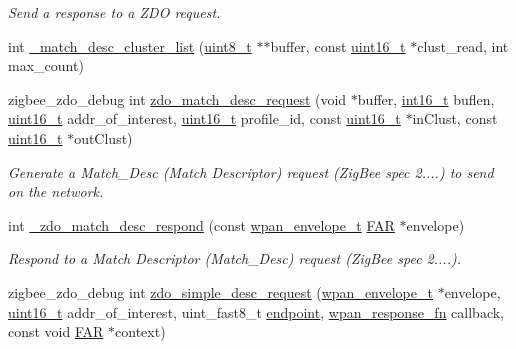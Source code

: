 \begin{DoxyCompactItemize}
\begin{DoxyCompactList}\small\item\em Send a response to a Z\+DO request. \end{DoxyCompactList}\item 
int \hyperlink{group__zdo_ga1a65d88af9f0c9906d548aa1ff2586f7}{\+\_\+match\+\_\+desc\+\_\+cluster\+\_\+list} (\hyperlink{group__hal__dos_gae1affc9ca37cfb624959c866a73f83c2}{uint8\+\_\+t} $\ast$$\ast$buffer, const \hyperlink{group__hal__dos_ga5a8b2dc9e45a9ee81a94ef304fb62505}{uint16\+\_\+t} $\ast$clust\+\_\+read, int max\+\_\+count)
\item 
zigbee\+\_\+zdo\+\_\+debug int \hyperlink{group__zdo_ga5746efffb4b90718eb973796f2b4bb41}{zdo\+\_\+match\+\_\+desc\+\_\+request} (void $\ast$buffer, \hyperlink{group__hal__dos_ga2140805d08462d474b82ddc8d1c2f3e6}{int16\+\_\+t} buflen, \hyperlink{group__hal__dos_ga5a8b2dc9e45a9ee81a94ef304fb62505}{uint16\+\_\+t} addr\+\_\+of\+\_\+interest, \hyperlink{group__hal__dos_ga5a8b2dc9e45a9ee81a94ef304fb62505}{uint16\+\_\+t} profile\+\_\+id, const \hyperlink{group__hal__dos_ga5a8b2dc9e45a9ee81a94ef304fb62505}{uint16\+\_\+t} $\ast$in\+Clust, const \hyperlink{group__hal__dos_ga5a8b2dc9e45a9ee81a94ef304fb62505}{uint16\+\_\+t} $\ast$out\+Clust)
\begin{DoxyCompactList}\small\item\em Generate a Match\+\_\+\+Desc (Match Descriptor) request (Zig\+Bee spec 2....) to send on the network. \end{DoxyCompactList}\item 
int \hyperlink{group__zdo_ga41d93e5e12d9ed4e18d092fe3af779a2}{\+\_\+zdo\+\_\+match\+\_\+desc\+\_\+respond} (const \hyperlink{structwpan__envelope__t}{wpan\+\_\+envelope\+\_\+t} \hyperlink{group__hal_gaef060b3456fdcc093a7210a762d5f2ed}{F\+AR} $\ast$envelope)
\begin{DoxyCompactList}\small\item\em Respond to a Match Descriptor (Match\+\_\+\+Desc) request (Zig\+Bee spec 2....). \end{DoxyCompactList}\item 
zigbee\+\_\+zdo\+\_\+debug int \hyperlink{group__zdo_gafbbece379bc09af360099d1e0825d507}{zdo\+\_\+simple\+\_\+desc\+\_\+request} (\hyperlink{structwpan__envelope__t}{wpan\+\_\+envelope\+\_\+t} $\ast$envelope, \hyperlink{group__hal__dos_ga5a8b2dc9e45a9ee81a94ef304fb62505}{uint16\+\_\+t} addr\+\_\+of\+\_\+interest, uint\+\_\+fast8\+\_\+t \hyperlink{group__zdo_ga7d397493728da2bca8d55b2d61c4ec5d}{endpoint}, \hyperlink{group__wpan__aps_gabf0a6b85c9ff3ff9104c8b58c1436d72}{wpan\+\_\+response\+\_\+fn} callback, const void \hyperlink{group__hal_gaef060b3456fdcc093a7210a762d5f2ed}{F\+AR} $\ast$context)
$$
\end{DoxyCompactItemize}
